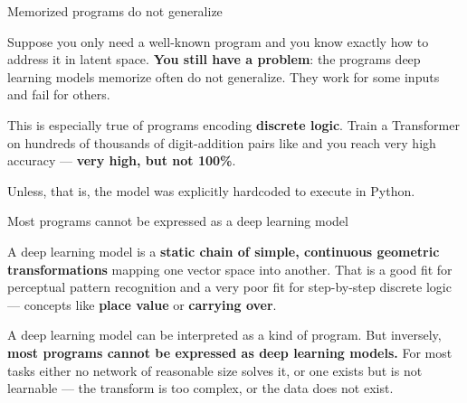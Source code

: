 \documentclass[aspectratio=169,11pt,t]{beamer}
\begin{document}
\begin{frame}[shrink=25]{Memorized programs do not generalize}
{\fontsize{9.4}{12.6}\selectfont\color{fg2}Suppose you only need a well-known program and you know exactly how to address it in latent space. \textbf{You still have a problem}: the programs deep learning models memorize often do not generalize. They work for some inputs and fail for others.\par}\vskip 4pt
{\fontsize{9.4}{12.6}\selectfont\color{fg2}This is especially true of programs encoding \textbf{discrete logic}. Train a Transformer on hundreds of thousands of digit-addition pairs like  and you reach very high accuracy --- \textbf{very high, but not 100\%}.\par}\vskip 4pt
\begin{minipage}[t]{0.494\textwidth}
\end{minipage}%
\hfill
\begin{minipage}[t]{0.494\textwidth}
\end{minipage}%
{\fontsize{9.4}{12.6}\selectfont\color{fg2}Unless, that is, the model was explicitly hardcoded to execute  in Python.\par}\vskip 4pt
\end{frame}

\begin{frame}[shrink=25]{Most programs cannot be expressed as a deep learning model}
{\fontsize{9.4}{12.6}\selectfont\color{fg2}A deep learning model is a \textbf{static chain of simple, continuous geometric transformations} mapping one vector space into another. That is a good fit for perceptual pattern recognition and a very poor fit for step-by-step discrete logic --- concepts like \textbf{place value} or \textbf{carrying over}.\par}\vskip 4pt
\begin{iband}[signal]
A deep learning model can be interpreted as a kind of program. But inversely, \textbf{most programs cannot be expressed as deep learning models.} For most tasks either no network of reasonable size solves it, or one exists but is not learnable --- the transform is too complex, or the data does not exist.
\end{iband}
\end{frame}
\end{document}
